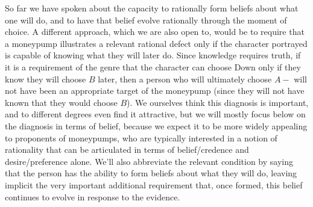 \documentclass[11pt]{article}
\theoremstyle{definition}
\theoremstyle{definition}
\begin{document}
So far we have spoken about the capacity to rationally form beliefs about what one will do, and to have that belief evolve rationally through the moment of choice. A different approach, which we are also open to, would be to require that a moneypump illustrates a relevant rational defect only if the character portrayed is capable of knowing what they will later do. Since knowledge requires truth, if it is a requirement of the genre that the character can choose Down only if they know they will choose $B$ later, then a person who will ultimately choose $A-$ will not have been an appropriate target of the moneypump (since they will not have known that they would choose $B$). We ourselves think this diagnosis is important, and to different degrees even find it attractive, but we will mostly focus below on the diagnosis in terms of belief, because we expect it to be more widely appealing to proponents of moneypumps, who are typically interested in a notion of rationality that can be articulated in terms of belief/credence and desire/preference alone. We'll also abbreviate the relevant condition by saying that the person has the ability to form beliefs about what they will do, leaving implicit the very important additional requirement that, once formed, this belief continues to evolve in response to the evidence.
\end{document}

